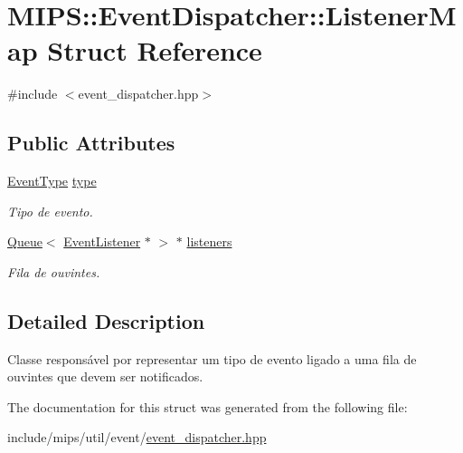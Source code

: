 \hypertarget{structMIPS_1_1EventDispatcher_1_1ListenerMap}{}\section{M\+I\+PS\+:\+:Event\+Dispatcher\+:\+:Listener\+Map Struct Reference}
\label{structMIPS_1_1EventDispatcher_1_1ListenerMap}


{\ttfamily \#include $<$event\+\_\+dispatcher.\+hpp$>$}

\subsection*{Public Attributes}
\begin{DoxyCompactItemize}
\item 
\hyperlink{event_8hpp_a2b933d1ba3dc5a595db4dfa5b049c78c}{Event\+Type} \hyperlink{structMIPS_1_1EventDispatcher_1_1ListenerMap_a5ddb37f28dc960baf38ab62d87227cc8}{type}\hypertarget{structMIPS_1_1EventDispatcher_1_1ListenerMap_a5ddb37f28dc960baf38ab62d87227cc8}{}\label{structMIPS_1_1EventDispatcher_1_1ListenerMap_a5ddb37f28dc960baf38ab62d87227cc8}

\begin{DoxyCompactList}\small\item\em Tipo de evento. \end{DoxyCompactList}\item 
\hyperlink{classMIPS_1_1Queue}{Queue}$<$ \hyperlink{classMIPS_1_1EventListener}{Event\+Listener} $\ast$ $>$ $\ast$ \hyperlink{structMIPS_1_1EventDispatcher_1_1ListenerMap_a4cc956ad8c738da563c1db75247e8519}{listeners}\hypertarget{structMIPS_1_1EventDispatcher_1_1ListenerMap_a4cc956ad8c738da563c1db75247e8519}{}\label{structMIPS_1_1EventDispatcher_1_1ListenerMap_a4cc956ad8c738da563c1db75247e8519}

\begin{DoxyCompactList}\small\item\em Fila de ouvintes. \end{DoxyCompactList}\end{DoxyCompactItemize}


\subsection{Detailed Description}
Classe responsável por representar um tipo de evento ligado a uma fila de ouvintes que devem ser notificados. 

The documentation for this struct was generated from the following file\+:\begin{DoxyCompactItemize}
\item 
include/mips/util/event/\hyperlink{event__dispatcher_8hpp}{event\+\_\+dispatcher.\+hpp}\end{DoxyCompactItemize}
